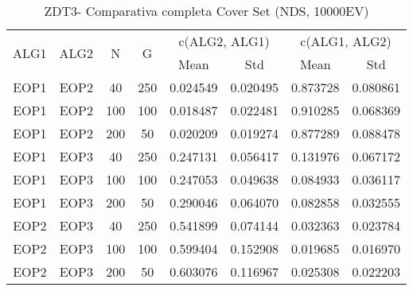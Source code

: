 \begin{table}[H]
\centering
\renewcommand{\arraystretch}{1.5}
\begin{tabular}{cccccccc}
\toprule
 \multirow{2}{*}{ALG1} &    \multirow{2}{*}{ALG2} &    \multirow{2}{*}{N} &    \multirow{2}{*}{G} &  \multicolumn{2}{c}{c(ALG2, ALG1)} &  \multicolumn{2}{c}{c(ALG1, ALG2)} \\ \cline{5-6} \cline{7-8}
   &   &   &   &  Mean &  Std &  Mean &  Std \\
\midrule
 EOP1 &  EOP2 &   40 &  250 &            0.024549 &           0.020495 &            0.873728 &           0.080861 \\
 EOP1 &  EOP2 &  100 &  100 &            0.018487 &           0.022481 &            0.910285 &           0.068369 \\
 EOP1 &  EOP2 &  200 &   50 &            0.020209 &           0.019274 &            0.877289 &           0.088478 \\
 EOP1 &  EOP3 &   40 &  250 &            0.247131 &           0.056417 &            0.131976 &           0.067172 \\
 EOP1 &  EOP3 &  100 &  100 &            0.247053 &           0.049638 &            0.084933 &           0.036117 \\
 EOP1 &  EOP3 &  200 &   50 &            0.290046 &           0.064070 &            0.082858 &           0.032555 \\
 EOP2 &  EOP3 &   40 &  250 &            0.541899 &           0.074144 &            0.032363 &           0.023784 \\
 EOP2 &  EOP3 &  100 &  100 &            0.599404 &           0.152908 &            0.019685 &           0.016970 \\
 EOP2 &  EOP3 &  200 &   50 &            0.603076 &           0.116967 &            0.025308 &           0.022203 \\
\bottomrule
\end{tabular}
\caption{ZDT3- Comparativa completa Cover Set (NDS, 10000EV)}
\label{table:8}
\end{table}



